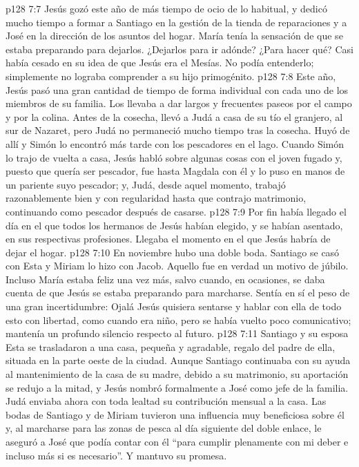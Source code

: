 \vs p128 7:7 \pc Jesús gozó este año de más tiempo de ocio de lo habitual, y dedicó mucho tiempo a formar a Santiago en la gestión de la tienda de reparaciones y a José en la dirección de los asuntos del hogar. María tenía la sensación de que se estaba preparando para dejarlos. ¿Dejarlos para ir adónde? ¿Para hacer qué? Casi había cesado en su idea de que Jesús era el Mesías. No podía entenderlo; simplemente no lograba comprender a su hijo primogénito.
\vs p128 7:8 Este año, Jesús pasó una gran cantidad de tiempo de forma individual con cada uno de los miembros de su familia. Los llevaba a dar largos y frecuentes paseos por el campo y por la colina. Antes de la cosecha, llevó a Judá a casa de su tío el granjero, al sur de Nazaret, pero Judá no permaneció mucho tiempo tras la cosecha. Huyó de allí y Simón lo encontró más tarde con los pescadores en el lago. Cuando Simón lo trajo de vuelta a casa, Jesús habló sobre algunas cosas con el joven fugado y, puesto que quería ser pescador, fue hasta Magdala con él y lo puso en manos de un pariente suyo pescador; y, Judá, desde aquel momento, trabajó razonablemente bien y con regularidad hasta que contrajo matrimonio, continuando como pescador después de casarse.
\vs p128 7:9 \pc Por fin había llegado el día en el que todos los hermanos de Jesús habían elegido, y se habían asentado, en sus respectivas profesiones. Llegaba el momento en el que Jesús habría de dejar el hogar.
\vs p128 7:10 \pc En noviembre hubo una doble boda. Santiago se casó con Esta y Miriam lo hizo con Jacob. Aquello fue en verdad un motivo de júbilo. Incluso María estaba feliz una vez más, salvo cuando, en ocasiones, se daba cuenta de que Jesús se estaba preparando para marcharse. Sentía en sí el peso de una gran incertidumbre: Ojalá Jesús quisiera sentarse y hablar con ella de todo esto con libertad, como cuando era niño, pero se había vuelto poco comunicativo; mantenía un profundo silencio respecto al futuro.
\vs p128 7:11 Santiago y su esposa Esta se trasladaron a una casa, pequeña y agradable, regalo del padre de ella, situada en la parte oeste de la ciudad. Aunque Santiago continuaba con su ayuda al mantenimiento de la casa de su madre, debido a su matrimonio, su aportación se redujo a la mitad, y Jesús nombró formalmente a José como jefe de la familia. Judá enviaba ahora con toda lealtad su contribución mensual a la casa. Las bodas de Santiago y de Miriam tuvieron una influencia muy beneficiosa sobre él y, al marcharse para las zonas de pesca al día siguiente del doble enlace, le aseguró a José que podía contar con él “para cumplir plenamente con mi deber e incluso más si es necesario”. Y mantuvo su promesa.

